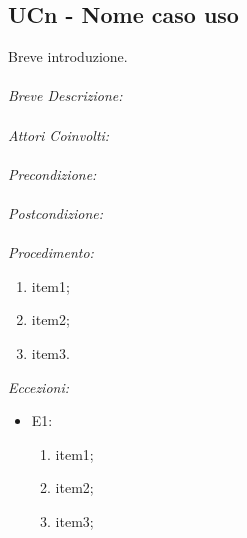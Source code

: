 \subsection{UCn - Nome caso uso}
Breve introduzione.
\\
\\
\textit{Breve Descrizione:} 
\\
\\
\textit{Attori Coinvolti:}
\\
\\
\textit{Precondizione:}
\\
\\
\textit{Postcondizione:}
\\
\\
\textit{Procedimento:}
\begin{enumerate}
	\item item1;
	\item item2;
	\item item3.
\end{enumerate}


\textit{Eccezioni:}
\begin{itemize}
	\item E1:
	\begin{enumerate}
		\item item1;
		\item item2;
		\item item3;
	\end{enumerate}
\end{itemize}
